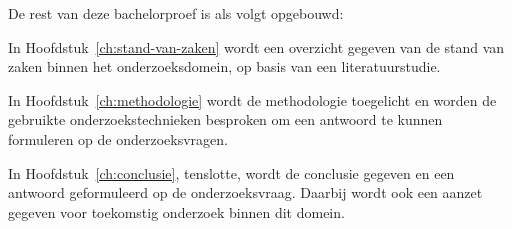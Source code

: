 
De rest van deze bachelorproef is als volgt opgebouwd:

In Hoofdstuk~\ref{ch:stand-van-zaken} wordt een overzicht gegeven van de stand van zaken binnen het onderzoeksdomein, op basis van een literatuurstudie.

In Hoofdstuk~\ref{ch:methodologie} wordt de methodologie toegelicht en worden de gebruikte onderzoekstechnieken besproken om een antwoord te kunnen formuleren op de onderzoeksvragen.


In Hoofdstuk~\ref{ch:conclusie}, tenslotte, wordt de conclusie gegeven en een antwoord geformuleerd op de onderzoeksvraag. Daarbij wordt ook een aanzet gegeven voor toekomstig onderzoek binnen dit domein.

